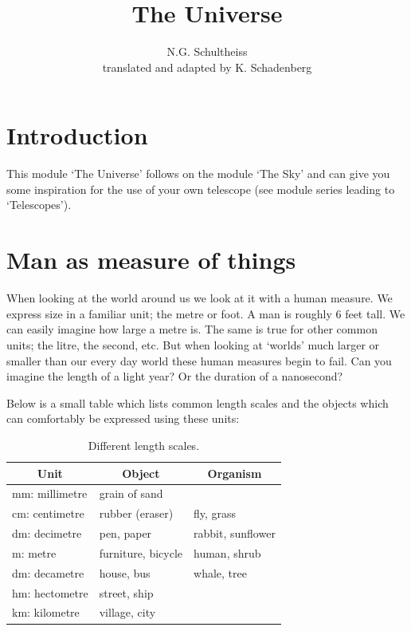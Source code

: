 \documentclass[12pt,a4paper]{article}
\author{N.G. Schultheiss \\ translated and adapted by K. Schadenberg}
\date{}
\title{The Universe}
\numberwithin{equation}{section}
\numberwithin{figure}{section}
\numberwithin{table}{section}
\begin{document}
\maketitle

\section{Introduction}
This module `The Universe' follows on the module `The Sky' and can give you some inspiration for the use of your own telescope (see module series leading to `Telescopes').

\section{Man as measure of things}
When looking at the world around us we look at it with a human measure. We express size in a familiar unit; the metre or foot. A man is roughly 6 feet tall. We can easily imagine how large a metre is. The same is true for other common units; the litre, the second, etc. But when looking at `worlds' much larger or smaller than our every day world these human measures begin to fail. Can you imagine the length of a light year? Or the duration of a nanosecond?

Below is a small table which lists common length scales and the objects which can comfortably be expressed  using these units:
\begin{table}[h]\begin{centering}
\begin{tabular}{|l|l|l|}
\hline \multicolumn{1}{|c|}{Unit} & \multicolumn{1}{c|}{Object} & \multicolumn{1}{c|}{Organism} \\ \hline \hline 
mm: millimetre & grain of sand &  \\ \hline
cm: centimetre & rubber (eraser) &  fly, grass \\ \hline
dm: decimetre & pen, paper & rabbit, sunflower  \\ \hline
m: metre & furniture, bicycle & human, shrub  \\ \hline
dm: decametre & house, bus & whale, tree  \\ \hline
hm: hectometre & street, ship &  \\ \hline
km: kilometre & village, city &  \\ \hline 
\end{tabular}
\caption{Different length scales.}\label{tab:length_scales}
\end{centering}\end{table}
\end{document}
